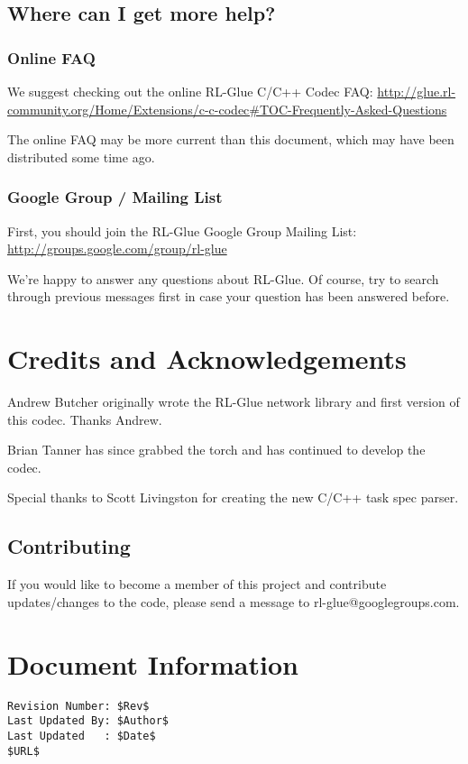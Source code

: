 \documentclass[11pt]{article}
\begin{document}
\subsection{Where can I get more help?}
\subsubsection{Online FAQ}
We suggest checking out the online RL-Glue C/C++ Codec FAQ:\newline
\url{http://glue.rl-community.org/Home/Extensions/c-c-codec#TOC-Frequently-Asked-Questions}

The online FAQ may be more current than this document, which may have been distributed some time ago.

\subsubsection{Google Group / Mailing List}
First, you should join the RL-Glue Google Group Mailing List:\newline
\url{http://groups.google.com/group/rl-glue}

We're happy to answer any questions about RL-Glue.  Of course, try to search through previous messages first in case your question has been answered before.


\section{Credits and Acknowledgements}
Andrew Butcher originally wrote the RL-Glue network library and first version of this codec.  Thanks Andrew.

Brian Tanner has since grabbed the torch and has continued to develop the codec.

Special thanks to Scott Livingston for creating the new C/C++ task spec parser.

\subsection{Contributing}
If you would like to become a member of this project and contribute updates/changes to the code, please send a message to rl-glue@googlegroups.com.


\section*{Document Information}
\begin{verbatim}
Revision Number: $Rev$
Last Updated By: $Author$
Last Updated   : $Date$
$URL$
\end{verbatim}
\end{document}
